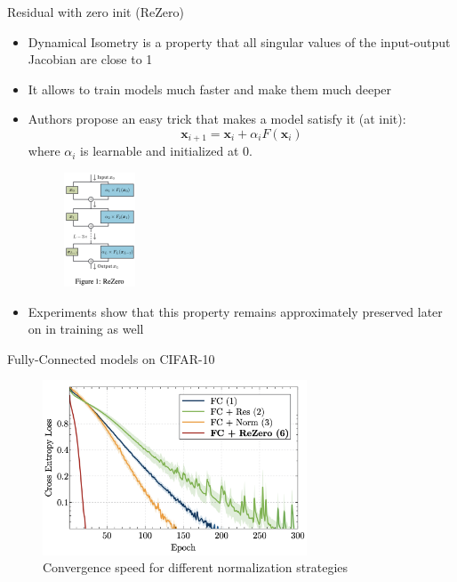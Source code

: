 \documentclass[handout, 10pt]{beamer}
\begin{document}
\begin{frame}{Residual with zero init (ReZero)}
\begin{itemize}
    \item\pause Dynamical Isometry is a property that all singular values of the input-output Jacobian are close to 1
    \item\pause It allows to train models much faster and make them much deeper
    \item\pause Authors propose an easy trick that makes a model satisfy it (at init):
    \begin{equation}
\boldsymbol{x}_{i+1}=\boldsymbol{x}_{i}+\alpha_{i} F\left(\boldsymbol{x}_{i}\right)
\end{equation}
    where $\alpha_i$ is learnable and initialized at 0.
    \begin{figure}
        \centering
        \includegraphics[width=0.2\textwidth]{images/rezero-block}
    \end{figure}
    \item\pause Experiments show that this property remains approximately preserved later on in training as well
\end{itemize}    
\end{frame}


\begin{frame}{Fully-Connected models on CIFAR-10}
\begin{figure}
\centering
\includegraphics[width=0.7\textwidth]{images/fc-models-cifar10.png}
\caption{Convergence speed for different normalization strategies}
\end{figure}
\end{frame}
\end{document}
